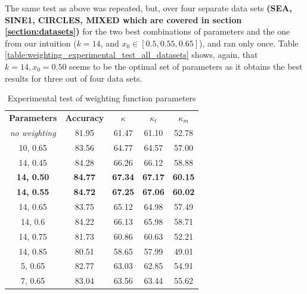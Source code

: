 The same test as above was repeated, but, over four separate data sets \textbf{(SEA, SINE1, CIRCLES, MIXED which are covered in section \ref{section:datasets})} for the two best combinations of parameters and the one from our intuition ($k=14$, and $x_0 \in [0.5, 0.55, 0.65]$), and ran only once. Table \ref{table:weighting_experimental_test_all_datasets} shows, again, that $k=14, x_0=0.50$ seems to be the optimal set of parameters as it obtains the best results for three out of four data sets.

\begin{table}[]
\caption{\label{table:weighting_experimental_test}Experimental test of weighting function parameters}
\centering
\begin{tabular}{|c|c|c|c|c|}
\hline
\textbf{Parameters} & \textbf{Accuracy} & \textbf{$\kappa$} & \textbf{$\kappa_t$} & \textbf{$\kappa_m$} \\ \hhline{=====}
\textit{no weighting}&81.95&61.47&61.10&52.78 \\ \hline
10, 0.65&83.56&64.77&64.57&57.00 \\ \hline
14, 0.45&84.28&66.26&66.12&58.88 \\ \hline
\textbf{14, 0.50}&\textbf{84.77}&\textbf{67.34}&\textbf{67.17}&\textbf{60.15} \\ \hline
\textbf{14, 0.55}&\textbf{84.72}&\textbf{67.25}&\textbf{67.06}&\textbf{60.02} \\ \hline
14, 0.65&83.75&65.12&64.98&57.49 \\ \hline
14, 0.6&84.22&66.13&65.98&58.71 \\ \hline
14, 0.75&81.73&60.86&60.63&52.21 \\ \hline
14, 0.85&80.51&58.65&57.99&49.01 \\ \hline
5, 0.65&82.77&63.03&62.85&54.91 \\ \hline
7, 0.65&83.04&63.56&63.44&55.62 \\ \hline
\end{tabular}
\end{table}

